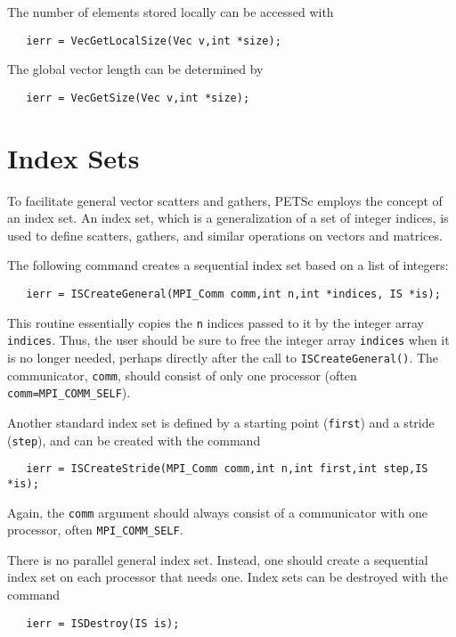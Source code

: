 The number of elements stored locally can be accessed with
\begin{verbatim}
   ierr = VecGetLocalSize(Vec v,int *size);
\end{verbatim}
The global vector length can be determined by 
\begin{verbatim}
   ierr = VecGetSize(Vec v,int *size);
\end{verbatim}
 
\section{Index Sets} 
\label{sec:indexset}

To facilitate general vector scatters and gathers, PETSc employs the 
concept of an index set.  An index set, which is a generalization of a 
set of integer indices, is used to define scatters, gathers, and similar 
operations on vectors and matrices. 

The following command creates a sequential index set based on a list 
of integers: 
\begin{verbatim}
   ierr = ISCreateGeneral(MPI_Comm comm,int n,int *indices, IS *is);
\end{verbatim}
This routine essentially copies the {\tt n} indices passed 
to it by the integer array {\tt indices}.  
Thus, the user should be sure to free the integer array {\tt indices} 
when it is no longer needed, perhaps directly after the call to 
{\tt ISCreateGeneral()}. The communicator, {\tt comm}, should consist of only
one processor (often {\tt comm=MPI\_COMM\_SELF}).

Another standard index set is defined by a starting point ({\tt first}) and a
stride ({\tt step}),  and can be created with the command
\begin{verbatim}
   ierr = ISCreateStride(MPI_Comm comm,int n,int first,int step,IS *is);
\end{verbatim}
Again, the {\tt comm} argument should always consist of
a communicator with one processor, often {\tt MPI\_COMM\_SELF}.

There is no parallel general index set. Instead, one should create a sequential
index set on each processor that needs one.
Index sets can be destroyed with the command 
\begin{verbatim}
   ierr = ISDestroy(IS is); 
\end{verbatim}

